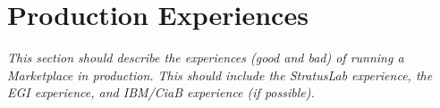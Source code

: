 \section{Production Experiences}
\label{sec:production}

{\em This section should describe the experiences (good and bad) of
  running a Marketplace in production.  This should include the
  StratusLab experience, the EGI experience, and IBM/CiaB experience
  (if possible).}
